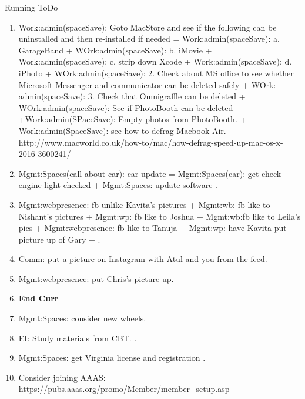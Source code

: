 \begin{columns}
\begin{column}{0.5\linewidth}
\begin{block}{Running ToDo}
\begin{enumerate}
        \item \tiny Work:admin(spaceSave): Goto MacStore and see if the following can be uninstalled and then
          re-installed if needed = Work:admin(spaceSave):
          a. GarageBand  + WOrk:admin(spaceSave):  b. iMovie +
          Work:admin(spaceSave): c. strip down Xcode +
          Work:admin(spaceSave): d. iPhoto 
          + WOrk:admin(spaceSave): 2. Check about MS office to see whether Microsoft Messenger and
          communicator can be deleted safely 
          + WOrk: admin(spaceSave): 3. Check that Omnigraffle can be
          deleted + WOrk:admin(spaceSave): See if PhotoBooth can be deleted +
          +Work:admin(SPaceSave): Empty photos from PhotoBooth. 
          + Work:admin(SpaceSave): see how to defrag Macbook Air.
          http://www.macworld.co.uk/how-to/mac/how-defrag-speed-up-mac-os-x-2016-3600241/ 
 
        \item \tiny Mgmt:Spaces(call about car): car update = Mgmt:Spaces(car): get check engine light checked +
          Mgmt:Spaces: update software . 

        \item \tiny Mgmt:webpresence: fb unlike Kavita’s pictures + Mgmt:wb:
          fb like to Nishant's pictures +  Mgmt:wp: fb like to Joshua
          + Mgmt:wb:fb like to Leila's pics + Mgmt:webpresence: fb
          like to Tanuja + Mgmt:wp: have Kavita put picture up of Gary  + .

        \item \tiny Comm: put a picture on Instagram with Atul and you
          from the feed. 

        \item \tiny Mgmt:webpresence: put Chris's picture up. 

        \item \tiny  \textbf{End Curr} 

        \item \tiny  Mgmt:Spaces: consider new wheels.
        \item \tiny EI: Study materials from CBT.  
          .

        \item \tiny Mgmt:Spaces: get Virginia license and registration
          . 

        \item \tiny Consider joining AAAS: \url{https://pubs.aaas.org/promo/Member/member_setup.asp}


\end{enumerate}
\end{block}
\end{column}
\end{columns}
